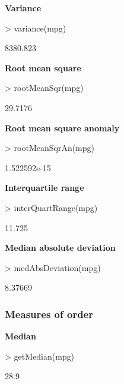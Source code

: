 \documentclass[a4paper]{article}
\begin{document}
\textbf{Variance}
\begin{Schunk}
\begin{Sinput}
> variance(mpg)
\end{Sinput}
\begin{Soutput}
[1] 8380.823
\end{Soutput}
\end{Schunk}


\textbf{Root mean square}
\begin{Schunk}
\begin{Sinput}
> rootMeanSqr(mpg)
\end{Sinput}
\begin{Soutput}
[1] 29.7176
\end{Soutput}
\end{Schunk}

\textbf{Root mean square anomaly}
\begin{Schunk}
\begin{Sinput}
> rootMeanSqrAn(mpg)
\end{Sinput}
\begin{Soutput}
[1] 1.522592e-15
\end{Soutput}
\end{Schunk}

\textbf{Interquartile range}
\begin{Schunk}
\begin{Sinput}
> interQuartRange(mpg)
\end{Sinput}
\begin{Soutput}
[1] 11.725
\end{Soutput}
\end{Schunk}

\textbf{Median absolute deviation}
\begin{Schunk}
\begin{Sinput}
> medAbsDeviation(mpg)
\end{Sinput}
\begin{Soutput}
[1] 8.37669
\end{Soutput}
\end{Schunk}


\subsubsection*{Measures of order}



\textbf{Median}
\begin{Schunk}
\begin{Sinput}
> getMedian(mpg)
\end{Sinput}
\begin{Soutput}
[1] 28.9
\end{Soutput}
\end{Schunk}
\end{document}
